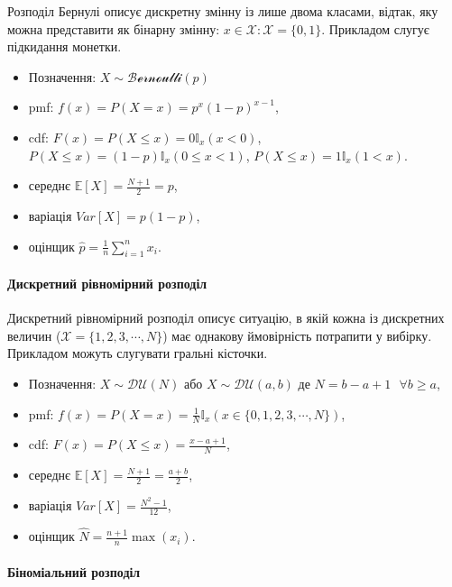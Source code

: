 \documentclass[
  11pt,
]{book}
\begin{document}
Розподіл Бернулі описує дискретну змінну із лише двома класами, відтак, яку можна представити як бінарну змінну: \(x \in \mathcal{X}: \mathcal{X} = \{0, 1\}\). Прикладом слугує підкидання монетки.

\begin{itemize}
\item
  Позначення: \(X \sim \mathcal{Bernoulli}(p)\)
\item
  pmf: \(f(x) = P(X = x) = p^x (1-p)^{x-1}\),
\item
  cdf: \(F(x) = P(X \leq x) = 0 \mathbb{I}_x(x < 0)\), \(P(X \leq x) = (1 - p) \mathbb{I}_x(0 \leq x < 1)\), \(P(X \leq x) = 1 \mathbb{I}_x(1 < x)\).
\item
  середнє \(\mathbb{E} [X] = \frac{N+1}{2} = p\),
\item
  варіація \(Var[X] = p(1 - p)\),
\item
  оцінщик \(\hat{p} = \frac{1}{n} \sum \limits_{i=1}^{n}x_i\).
\end{itemize}

\paragraph{Дискретний рівномірний розподіл}\label{ux434ux438ux441ux43aux440ux435ux442ux43dux438ux439-ux440ux456ux432ux43dux43eux43cux456ux440ux43dux438ux439-ux440ux43eux437ux43fux43eux434ux456ux43b}

Дискретний рівномірний розподіл описує ситуацію, в якій кожна із дискретних величин (\(\mathcal{X} = \{1, 2, 3, \cdots, N\}\)) має однакову ймовірність потрапити у вибірку. Прикладом можуть слугувати гральні кісточки.

\begin{itemize}
\item
  Позначення: \(X \sim \mathcal{DU}(N)\) або \(X \sim \mathcal{DU}(a, b)\) де \(N = b - a + 1 \text { } \forall b \geq a\),
\item
  pmf: \(f(x) = P(X = x) = \frac{1}{N} \mathbb{I}_x (x \in \{0, 1, 2, 3, \cdots, N\})\),
\item
  cdf: \(F(x) = P(X \leq x) = \frac{x - a + 1}{N}\),
\item
  середнє \(\mathbb{E} [X] = \frac{N+1}{2} = \frac{a+b}{2}\),
\item
  варіація \(Var[X] = \frac{N^2 - 1}{12}\),
\item
  оцінщик \(\hat{N} = \frac{n+1}{n} \max (x_i)\).
\end{itemize}

\paragraph{Біноміальний розподіл}\label{ux431ux456ux43dux43eux43cux456ux430ux43bux44cux43dux438ux439-ux440ux43eux437ux43fux43eux434ux456ux43b}
\end{document}
